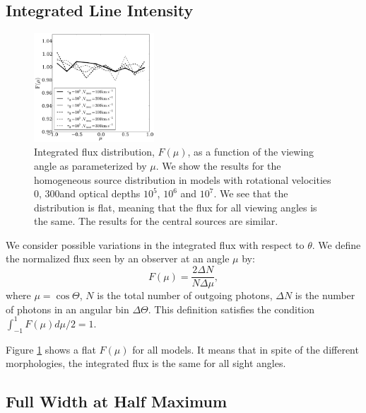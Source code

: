 \documentclass{emulateapj}
\newcommand{\kms}{{\ifmmode{{\mathrm{\,km\ s}^{-1}}}\else{\,km~s$^{-1}$}\fi}}
\begin{document}
\subsection{Integrated Line Intensity}

\begin{figure}
\begin{center}
  \includegraphics[width=0.4\textwidth]{f5.pdf}
\end{center}
\caption{Integrated flux distribution, $F(\mu)$, as a function of the
  viewing angle as parameterized by $\mu$. We show the results for the
  homogeneous source distribution in models with rotational velocities
  $0$\kms, $300$\kms and  optical depths $10^5$, $10^6$ and $10^7$. We
  see that the distribution is flat, meaning that the flux for all
  viewing angles is the same. The results for the central sources are
  similar. 
\label{fig:muhisto}}
\end{figure}

We consider possible variations in the integrated flux with respect to
$\theta$. We define the normalized flux seen by an observer at an
angle $\mu$ by: \begin{equation}
F(\mu) = \frac{2\Delta N}{N\Delta \mu}, 
\end{equation} 
%
where $\mu=\cos\Theta$, $N$ is the total number of outgoing photons,
$\Delta N$ is the number of photons in an angular bin $\Delta
\Theta$. This definition satisfies the condition
$\int_{-1}^{1}F(\mu)d\mu/2=1$. 

Figure \ref{fig:muhisto} shows a flat $F(\mu)$ for all models. It
means that in spite of the different morphologies, the integrated flux
is the same for all sight angles.  
	

\subsection{Full Width at Half Maximum}
\label{sec:widthpeak}
\end{document}
